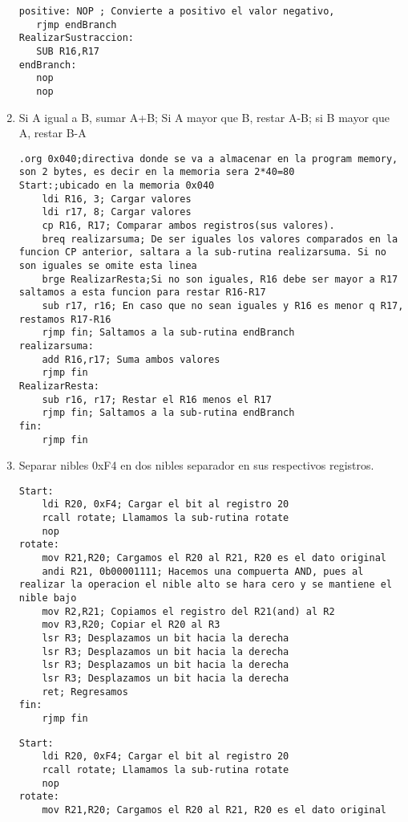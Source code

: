 \documentclass[
	12pt, %
	fleqn, %
	a4paper, %
	oneside, %
]{LegrandOrangeBook}
\begin{document}
\begin{enumerate}
\begin{lstlisting}[language={[RISC-V]Assembler},frame=single,caption={Desarrollo entre 2 o más sub-rutinas},captionpos=b,numbers=none]
   positive: NOP ; Convierte a positivo el valor negativo,
   rjmp endBranch
RealizarSustraccion:
   SUB R16,R17
endBranch:
   nop 
   nop
\end{lstlisting}
\item Si A igual a B, sumar A+B; Si A mayor que B, restar A-B; si B mayor que A, restar B-A
\begin{lstlisting}[language={[RISC-V]Assembler},frame=single,caption={Condicional de suma entre dos números},captionpos=b,numbers=none]
.org 0x040;directiva donde se va a almacenar en la program memory, son 2 bytes, es decir en la memoria sera 2*40=80
Start:;ubicado en la memoria 0x040	
	ldi R16, 3; Cargar valores
	ldi r17, 8; Cargar valores
	cp R16, R17; Comparar ambos registros(sus valores).
	breq realizarsuma; De ser iguales los valores comparados en la funcion CP anterior, saltara a la sub-rutina realizarsuma. Si no son iguales se omite esta linea
	brge RealizarResta;Si no son iguales, R16 debe ser mayor a R17 saltamos a esta funcion para restar R16-R17
	sub r17, r16; En caso que no sean iguales y R16 es menor q R17, restamos R17-R16
	rjmp fin; Saltamos a la sub-rutina endBranch
realizarsuma:
	add R16,r17; Suma ambos valores
	rjmp fin
RealizarResta:
	sub r16, r17; Restar el R16 menos el R17
	rjmp fin; Saltamos a la sub-rutina endBranch
fin:
	rjmp fin
\end{lstlisting}
\item Separar nibles 0xF4 en dos nibles separador en sus respectivos registros.
\begin{lstlisting}[language={[RISC-V]Assembler},frame=single,caption={Separar nibles usando LSR},captionpos=b,numbers=none]
Start:
	ldi R20, 0xF4; Cargar el bit al registro 20
	rcall rotate; Llamamos la sub-rutina rotate
	nop
rotate:
	mov R21,R20; Cargamos el R20 al R21, R20 es el dato original
	andi R21, 0b00001111; Hacemos una compuerta AND, pues al realizar la operacion el nible alto se hara cero y se mantiene el nible bajo
	mov R2,R21; Copiamos el registro del R21(and) al R2
	mov R3,R20; Copiar el R20 al R3
	lsr R3; Desplazamos un bit hacia la derecha
	lsr R3; Desplazamos un bit hacia la derecha
	lsr R3; Desplazamos un bit hacia la derecha
	lsr R3; Desplazamos un bit hacia la derecha
	ret; Regresamos
fin:
	rjmp fin
\end{lstlisting}
\begin{lstlisting}[language={[RISC-V]Assembler},frame=single,caption={Usando FOR},captionpos=b,numbers=none]
Start:
	ldi R20, 0xF4; Cargar el bit al registro 20
	rcall rotate; Llamamos la sub-rutina rotate
	nop
rotate:
	mov R21,R20; Cargamos el R20 al R21, R20 es el dato original

\end{lstlisting}
\end{enumerate}
\end{document}
